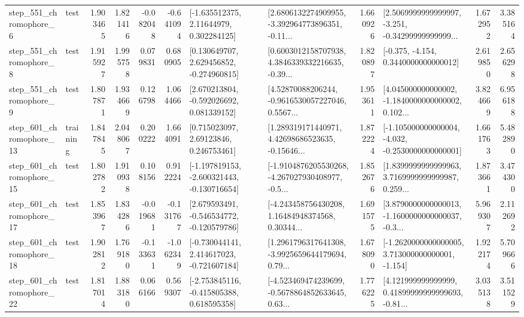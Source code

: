 \begin{tabular}{llrrrrllrlrr}
   step\_551\_chromophore\_6 &      test &      1.903465 &    1.821416 &     -0.082048 & -0.641094 &     [-1.635512375, 2.11644979, 0.302284125] &  [2.6806132274909955, -3.392964773896351, -0.11... &       1.660926 &  [2.5069999999999997, -3.251, -0.34299999999999... &            1.672952 &          3.385164 \\
   step\_551\_chromophore\_8 &      test &      1.915927 &    1.995758 &      0.079831 &  0.680905 &    [0.130649707, 2.629456852, -0.274960815] &  [0.6003012158707938, 4.3846339332216635, -0.39... &       1.820897 &               [-0.375, -4.154, 0.3440000000000012] &            2.619850 &          2.656298 \\
   step\_551\_chromophore\_9 &      test &      1.807871 &    1.934669 &      0.126798 &  1.064466 &    [2.670213804, -0.592026692, 0.081339152] &  [4.52870088206244, -0.9616530057227046, 0.5567... &       1.953611 &  [4.045000000000002, -1.1840000000000002, 0.102... &            3.824669 &          6.956188 \\
  step\_601\_chromophore\_13 &  training &      1.847845 &    2.048067 &      0.200222 &  1.664091 &      [0.715023097, 2.69123846, 0.246753461] &  [1.289319171440971, 4.42698686523635, -0.15646... &       1.872224 &  [-1.105000000000004, -4.032, -0.2530000000000001] &            1.661763 &          5.482890 \\
  step\_601\_chromophore\_15 &      test &      1.802782 &    1.910938 &      0.108156 &  0.912224 &  [-1.197819153, -2.600321443, -0.130716654] &  [-1.9104876205530268, -4.267027930408977, -0.5... &       1.852676 &  [1.8399999999999963, 3.7169999999999987, 0.259... &            1.873661 &          3.474300 \\
  step\_601\_chromophore\_17 &      test &      1.853967 &    1.834286 &     -0.019681 & -0.131767 &   [2.679593491, -0.546534772, -0.120579786] &  [-4.243458756430208, 1.16484948374568, 0.30344... &       1.691575 &  [3.8790000000000013, -1.1600000000000037, -0.3... &            5.969307 &          2.112692 \\
  step\_601\_chromophore\_18 &      test &      1.902812 &    1.769180 &     -0.133631 & -1.062349 &   [-0.730044141, 2.414617023, -0.721607184] &  [1.2961796317641308, -3.9925659644179694, 0.79... &       1.678090 &   [-1.2620000000000005, 3.713000000000001, -1.154] &            1.922174 &          5.709666 \\
  step\_601\_chromophore\_22 &      test &      1.817014 &    1.883180 &      0.066166 &  0.569307 &   [-2.753845116, -0.415805388, 0.618595358] &  [-4.523469474239699, -0.5678864852633645, 0.63... &       1.776225 &  [4.121999999999999, 0.41899999999999693, -0.81... &            3.035138 &          3.511529 \\

\end{tabular}
